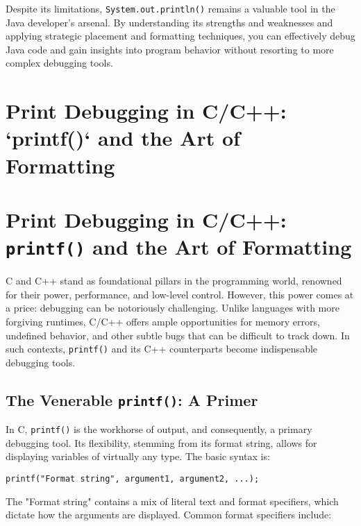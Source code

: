 \documentclass{article}
\begin{document}
{{{{Despite its limitations, \texttt{System.out.println()} remains a valuable tool in the Java developer's arsenal. By understanding its strengths and weaknesses and applying strategic placement and formatting techniques, you can effectively debug Java code and gain insights into program behavior without resorting to more complex debugging tools.

\newpage

\section*{Print Debugging in C/C++: `printf()` and the Art of Formatting} %
\label{chapter-9-4-Print_Debugging_in_C_C_____printf____and}

\section*{Print Debugging in C/C++: \texttt{printf()} and the Art of Formatting}

C and C++ stand as foundational pillars in the programming world, renowned for their power, performance, and low-level control. However, this power comes at a price: debugging can be notoriously challenging. Unlike languages with more forgiving runtimes, C/C++ offers ample opportunities for memory errors, undefined behavior, and other subtle bugs that can be difficult to track down. In such contexts, \texttt{printf()} and its C++ counterparts become indispensable debugging tools.

\subsection*{The Venerable \texttt{printf()}: A Primer}

In C, \texttt{printf()} is the workhorse of output, and consequently, a primary debugging tool. Its flexibility, stemming from its format string, allows for displaying variables of virtually any type. The basic syntax is:

\begin{verbatim}
printf("Format string", argument1, argument2, ...);
\end{verbatim}

The "Format string" contains a mix of literal text and format specifiers, which dictate how the arguments are displayed. Common format specifiers include:

}}}}
\end{document}
